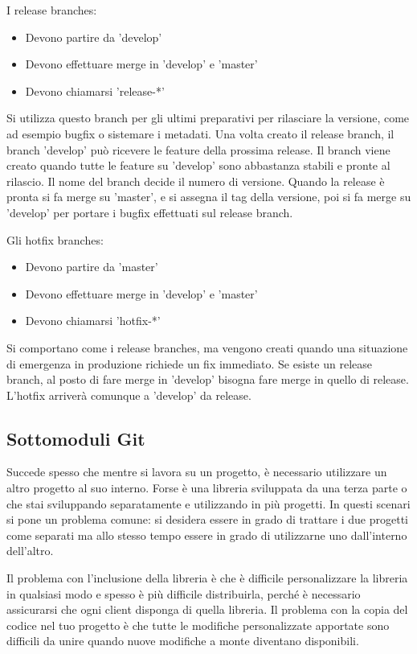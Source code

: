 \documentclass[a4paper,12pt,titlepage,oneside]{book}
\begin{document}
I release branches:
\begin{itemize}
    \item Devono partire da 'develop'
    \item Devono effettuare merge in 'develop' e 'master'
    \item Devono chiamarsi 'release-*'
\end{itemize}
Si utilizza questo branch per gli ultimi preparativi per rilasciare la versione, come ad esempio bugfix o sistemare i metadati. Una volta creato il release branch, il branch 'develop' 
può ricevere le feature della prossima release. Il branch viene creato quando tutte le feature su 'develop' sono abbastanza stabili e pronte al rilascio. Il nome del branch decide il numero di versione.
Quando la release è pronta si fa merge su 'master', e si assegna il tag della versione, poi si fa merge su 'develop' per portare i bugfix effettuati sul release branch.

Gli hotfix branches:
\begin{itemize}
    \item Devono partire da 'master'
    \item Devono effettuare merge in 'develop' e 'master'
    \item Devono chiamarsi 'hotfix-*'
\end{itemize}
Si comportano come i release branches, ma vengono creati quando una situazione di emergenza in produzione richiede un fix immediato. Se esiste un release branch, al posto di fare merge in 'develop' 
bisogna fare merge in quello di release. L'hotfix arriverà comunque a 'develop' da release.

\subsection{Sottomoduli Git}
Succede spesso che mentre si lavora su un progetto, è necessario utilizzare un altro progetto al suo interno. Forse è una libreria sviluppata da una terza parte o che stai sviluppando separatamente e utilizzando in più progetti. 
In questi scenari si pone un problema comune: si desidera essere in grado di trattare i due progetti come separati ma allo stesso tempo essere in grado di utilizzarne uno dall'interno dell'altro.

Il problema con l'inclusione della libreria è che è difficile personalizzare la libreria in qualsiasi modo e spesso è più difficile distribuirla, perché è necessario assicurarsi che ogni client disponga di quella libreria. 
Il problema con la copia del codice nel tuo progetto è che tutte le modifiche personalizzate apportate sono difficili da unire quando nuove modifiche a monte diventano disponibili.
\end{document}
